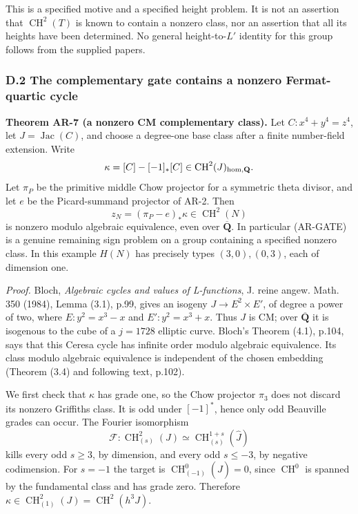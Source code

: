 This is a specified motive and a specified height problem. It is not an
assertion that \(\operatorname{CH}^2(T)\) is known to contain a nonzero
class, nor an assertion that all its heights have been determined. No
general height-to-\(L'\) identity for this group follows from the
supplied papers.

\subsubsection{D.2 The complementary gate contains a nonzero
Fermat-quartic
cycle}\label{d.2-the-complementary-gate-contains-a-nonzero-fermat-quartic-cycle}

\textbf{Theorem AR-7 (a nonzero CM complementary class).} Let
\(C:x^4+y^4=z^4\), let \(J=\operatorname{Jac}(C)\), and choose a
degree-one base class after a finite number-field extension. Write \[
\kappa=[C]-[-1]_*[C]\in\operatorname{CH}^2(J)_{\rm hom,\mathbf Q}.
\] Let \(\pi_P\) be the primitive middle Chow projector for a symmetric
theta divisor, and let \(e\) be the Picard-summand projector of AR-2.
Then \[
z_N=(\pi_P-e)_*\kappa\in\operatorname{CH}^2(N)
\tag{AR.9}
\] is nonzero modulo algebraic equivalence, even over
\(\overline{\mathbf Q}\). In particular (AR-GATE) is a genuine remaining
sign problem on a group containing a specified nonzero class. In this
example \(H(N)\) has precisely types \((3,0),(0,3)\), each of dimension
one.

\emph{Proof.} Bloch, \emph{Algebraic cycles and values of L-functions},
J. reine angew. Math. 350 (1984), Lemma (3.1), p.99, gives an isogeny
\(J\to E^2\times E'\), of degree a power of two, where \(E:y^2=x^3-x\)
and \(E':y^2=x^3+x\). Thus \(J\) is CM; over \(\overline{\mathbf Q}\) it
is isogenous to the cube of a \(j=1728\) elliptic curve. Bloch's Theorem
(4.1), p.104, says that this Ceresa cycle has infinite order modulo
algebraic equivalence. Its class modulo algebraic equivalence is
independent of the chosen embedding (Theorem (3.4) and following text,
p.102).

We first check that \(\kappa\) has grade one, so the Chow projector
\(\pi_3\) does not discard its nonzero Griffiths class. It is odd under
\([-1]^*\), hence only odd Beauville grades can occur. The Fourier
isomorphism \[
\mathcal F:\operatorname{CH}^2_{(s)}(J)
 \simeq\operatorname{CH}^{1+s}_{(s)}(\widehat J)
\] kills every odd \(s\ge3\), by dimension, and every odd \(s\le-3\), by
negative codimension. For \(s=-1\) the target is
\(\operatorname{CH}^0_{(-1)}(\widehat J)=0\), since
\(\operatorname{CH}^0\) is spanned by the fundamental class and has
grade zero. Therefore
\(\kappa\in\operatorname{CH}^2_{(1)}(J)=\operatorname{CH}^2(h^3J)\).

